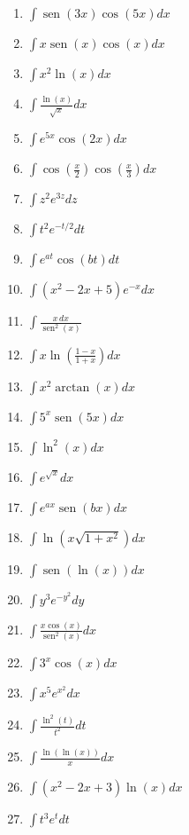 \documentclass{article}
\begin{document}
\begin{multicols}{2}
\begin{enumerate}
    \item $\displaystyle \int \operatorname{sen}(3x) \cos(5x) dx$
    \item $\displaystyle \int x \operatorname{sen}(x) \cos(x) dx$
    \item $\displaystyle \int x^2 \ln (x) dx$
    \item $\displaystyle \int \frac{\ln (x)}{\sqrt{x}} dx$
    \item $\displaystyle \int e^{5x} \cos (2x) dx$
    \item $\displaystyle \int \cos \left(\frac{x}{2}\right) \cos \left(\frac{x}{3}\right) dx$
    \item $\displaystyle \int z^2 e^{3z} dz$
    \item $\displaystyle \int t^2 e^{-t/2} dt$
    \item $\displaystyle \int e^{at} \cos (bt) dt$
    \item $\displaystyle \int (x^2 - 2x + 5) e^{-x} dx$
    \item $\displaystyle \int \frac{x \, dx}{\operatorname{sen}^2 (x)}$
    \item $\displaystyle \int x \ln \left(\frac{1 - x}{1 + x}\right) dx$
    \item $\displaystyle \int x^2 \operatorname{arctan} (x) dx$
    \item $\displaystyle \int 5^x \operatorname{sen} (5x) dx$
    \item $\displaystyle \int \ln^2 (x) dx$
    \item $\displaystyle \int e^{\sqrt{x}} dx$
    \item $\displaystyle \int e^{ax} \operatorname{sen} (bx) dx$
    \item $\displaystyle \int \ln (x \sqrt{1 + x^2}) dx$
    \item $\displaystyle \int \operatorname{sen} (\ln (x)) dx$
    \item $\displaystyle \int y^3 e^{-y^2} dy$
    \item $\displaystyle \int \frac{x \cos (x)}{\operatorname{sen}^2 (x)} dx$
    \item $\displaystyle \int 3^x \cos (x) dx$
    \item $\displaystyle \int x^5 e^{x^2} dx$
    \item $\displaystyle \int \frac{\ln^2 (t)}{t^2} dt$
    \item $\displaystyle \int \frac{\ln(\ln (x))}{x} dx$
    \item $\displaystyle \int (x^2 - 2x + 3) \ln (x) dx$
    \item $\displaystyle \int t^3 e^t dt$

\end{enumerate}
\end{multicols}
\end{document}
